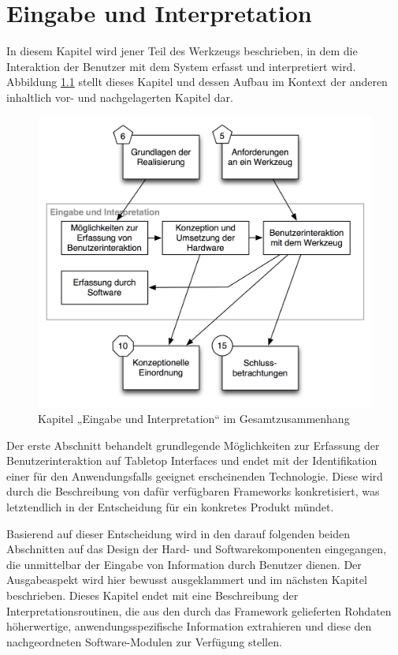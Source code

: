 
\chapter{Eingabe und Interpretation} %
\label{cha:input_&_interpretation}

In diesem Kapitel wird jener Teil des Werkzeugs beschrieben, in dem die Interaktion der Benutzer mit dem System erfasst und interpretiert wird. Abbildung \ref{fig:img_Kontextgrafiken_k7} stellt dieses Kapitel und dessen Aufbau im Kontext der anderen inhaltlich vor- und nachgelagerten Kapitel dar.

\begin{figure}[htbp]
	\centering
		\includegraphics[scale=0.6]{img/Kontextgrafiken/k7.png}
	\caption{Kapitel „Eingabe und Interpretation“ im Gesamtzusammenhang}
	\label{fig:img_Kontextgrafiken_k7}
\end{figure}

Der erste Abschnitt behandelt grundlegende Möglichkeiten zur Erfassung der Benutzerinteraktion auf Tabletop Interfaces und endet mit der Identifikation einer für den Anwendungsfalls geeignet erscheinenden Technologie. Diese wird durch die Beschreibung von dafür verfügbaren Frameworks konkretisiert, was letztendlich in der Entscheidung für ein konkretes Produkt mündet.

Basierend auf dieser Entscheidung wird in den darauf folgenden beiden Abschnitten auf das Design der Hard- und Softwarekomponenten eingegangen, die unmittelbar der Eingabe von Information durch Benutzer dienen. Der Ausgabeaspekt wird hier bewusst ausgeklammert und im nächsten Kapitel beschrieben. Dieses Kapitel endet mit eine Beschreibung der Interpretationsroutinen, die aus den durch das Framework gelieferten Rohdaten höherwertige, anwendungsspezifische Information extrahieren und diese den nachgeordneten Software-Modulen zur Verfügung stellen.

